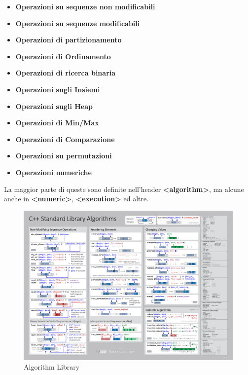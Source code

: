 \begin{itemize}
	\item \textsf{\small \textbf{Operazioni su sequenze non modificabili} }
	\item \textsf{\small \textbf{Operazioni su sequenze modificabili} }
	\item \textsf{\small \textbf{Operazioni di partizionamento} }
	\item \textsf{\small \textbf{Operazioni di Ordinamento} }
	\item \textsf{\small \textbf{Operazioni di ricerca binaria} }
	\item \textsf{\small \textbf{Operazioni sugli Insiemi} }
	\item \textsf{\small \textbf{Operazioni sugli Heap} }
	\item \textsf{\small \textbf{Operazioni di Min/Max} }
	\item \textsf{\small \textbf{Operazioni di Comparazione} }
	\item \textsf{\small \textbf{Operazioni su permutazioni} }
	\item \textsf{\small \textbf{Operazioni numeriche} }
\end{itemize}

\textsf{\small La maggior parte di queste sono definite nell'header \textbf{<algorithm>}, ma alcune anche in \textbf{<numeric>}, \textbf{<execution>} ed altre.} \\

\begin{figure}[H]
	\centering
	\includegraphics[width=1.2\textwidth, height=1.2\textheight, keepaspectratio]{./imgs/Algorithm_Library/algorithms.png}
	\caption{Algorithm Library}
	\label{fig:algorithms}
\end{figure}

